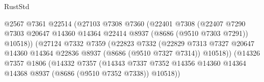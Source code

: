 \begin{lexlean}{RustStd}
\begin{coremodule}
                                        @2567
                                        @7361
                                        @22514
                                        (@27103
                                          @7308
                                          @7360
                                          (@22401
                                            @7308
                                            (@22407
                                              @7290
                                              @7303
                                              @20647
                                              @14360
                                              @14364
                                              @22414
                                              @8937
                                              (@8686 (@9510 @7303 @7291))
                                              @10518))
                                          (@27124
                                            @7332
                                            @7359
                                            (@22823
                                              @7332
                                              (@22829
                                                @7313
                                                @7327
                                                @20647
                                                @14360
                                                @14364
                                                @22836
                                                @8937
                                                (@8686 (@9510 @7327 @7314))
                                                @10518))
                                            (@14326
                                              @7357
                                              @1806
                                              (@14332
                                                @7357
                                                (@14343
                                                  @7337
                                                  @7352
                                                  @14356
                                                  @14360
                                                  @14364
                                                  @14368
                                                  @8937
                                                  (@8686 (@9510 @7352 @7338))
                                                  @10518))

\end{coremodule}
\end{lexlean}
